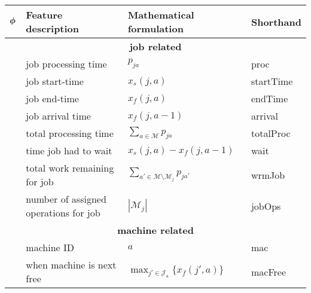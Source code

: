 \centering
\renewcommand{\arraystretch}{1.5}
\begin{tabular}{clll} %
	\toprule
	$\bm{\phi}$          & Feature description                       & Mathematical formulation                                                           & Shorthand    \\ 
	\midrule
	\multicolumn{4}{c}{\textbf{job related}}\\
	\phiproc         & job processing time                       & $p_{ja}$                                                                           & proc         \\
	\phistartTime    & job start-time                            & $x_s(j,a)$                                                                         & startTime    \\
	\phiendTime      & job end-time                              & $x_f(j,a)$                                                                         & endTime      \\
	\phiarrivalTime  & job arrival time                          & $x_f(j,a-1)$                                                                       & arrival      \\ 
	\phitotalProc    & total processing time                     & $\sum_{a\in \mathcal{M}}p_{ja}$                                                    & totalProc    \\
	\phiwait         & time job had to wait                      & $x_s(j,a)-x_f(j,a-1) $                                                             & wait         \\   
	\phiwrmJob       & total work remaining for job              & $\sum_{a'\in\mathcal{M}\setminus \mathcal{M}_{j}}p_{ja'}$                          & wrmJob       \\
	\phijobOps       & number of assigned operations for job     & $|\mathcal{M}_j|$                                                                  & jobOps       \\ 
	\midrule
	\multicolumn{4}{c}{\textbf{machine related}}\\
	\phimac          & machine ID                                & $ a$                                                                               & mac          \\ 
	\phimacFree      & when machine is next free                 & $\max_{j'\in \mathcal{J}_a} \{x_f(j',a)\}$                                         & macFree      \\

\end{tabular}
